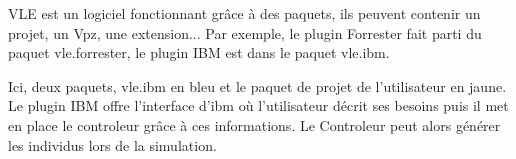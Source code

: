 VLE est un logiciel fonctionnant grâce à des paquets, ils peuvent contenir un projet, un Vpz, une extension... Par exemple, le plugin Forrester fait parti du paquet vle.forrester, le plugin IBM est dans le paquet vle.ibm.\\

\noindent\begin{minipage}{\linewidth}%
\end{minipage}

Ici, deux paquets, vle.ibm en bleu et le paquet de projet de l'utilisateur en jaune. Le plugin IBM offre l'interface d'ibm où l'utilisateur décrit ses besoins puis il met en place le controleur grâce à ces informations. Le Controleur peut alors générer les individus lors de la simulation.

